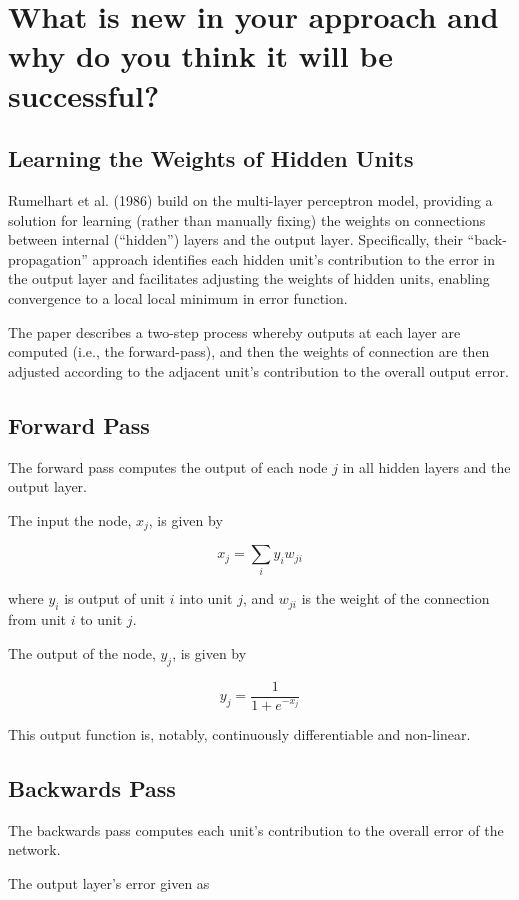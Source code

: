 \documentclass[10pt]{article}
\begin{document}
\section*{What is new in your approach and why do you think it will be successful?}

\subsection*{Learning the Weights of Hidden Units}
Rumelhart et al. (1986) build on the multi-layer perceptron model, providing a solution for learning (rather than manually fixing) the weights on connections between internal (``hidden'') layers and the output layer. Specifically, their ``back-propagation'' approach identifies each hidden unit's contribution to the error in the output layer and facilitates adjusting the weights of hidden units, enabling convergence to a local local minimum in error function.

The paper describes a two-step process whereby outputs at each layer are computed (i.e., the forward-pass), and then the weights of connection are then adjusted according to the adjacent unit's contribution to the overall output error.

\subsection*{Forward Pass}
The forward pass computes the output of each node $j$ in all hidden layers and the output layer.

The input the node, $x_j$, is given by

$$ x_j = \sum_{i}y_{i}w_{ji} $$

where $y_i$ is output of unit $i$ into unit $j$, and $w_{ji}$ is the weight of the connection from unit $i$ to unit $j$.

The output of the node, $y_j$, is given by

$$ y_j = \frac{1}{1 + e^{-x_j}} $$

This output function is, notably, continuously differentiable and non-linear.

\subsection*{Backwards Pass}

The backwards pass computes each unit's contribution to the overall error of the network.

The output layer's error given as
\end{document}
